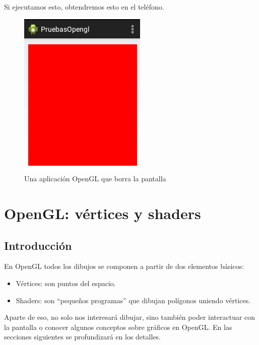 \documentclass[a4paper,12pt,spanish]{sphinxmanual}
\begin{document}
Si ejecutamos esto, obtendremos esto en el teléfono.
\begin{figure}[htbp]
\centering
\capstart

\includegraphics{rojoopengl.png}
\caption{Una aplicación OpenGL que borra la pantalla}\end{figure}


\chapter{OpenGL: vértices y shaders}
\label{cap2opengl::doc}\label{cap2opengl:opengl-vertices-y-shaders}

\section{Introducción}
\label{cap2opengl:introduccion}
En OpenGL todos los dibujos se componen a partir de dos elementos básicos:
\begin{itemize}
\item {} 
Vértices: son puntos del espacio.

\item {} 
Shaders: son ``pequeños programas'' que dibujan polígonos uniendo vértices.

\end{itemize}

Aparte de eso, no solo nos interesará dibujar, sino también poder interactuar con la pantalla o conocer algunos conceptos sobre gráficos en OpenGL. En las secciones siguientes se profundizará en los detalles.
\end{document}
